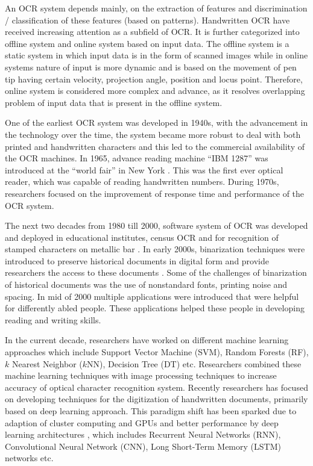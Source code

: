 \documentclass{article}
\begin{document}
An OCR system depends mainly, on the extraction of features and discrimination / classification of these features (based on patterns). Handwritten OCR have received increasing attention as a subfield of OCR.  It is further categorized into offline system \cite{pathan2012recognition,parvez2013offline} and online system \cite{connell2001template} based on input data. The offline system is a static system in which input data is in the form of scanned images while in online systems nature of input is more dynamic and is based on the movement of pen tip having certain velocity, projection angle, position and locus point. Therefore, online system is considered more complex and advance, as it resolves overlapping problem of input data that is present in the offline system.

One of the earliest OCR system was developed in 1940s, with the advancement in the technology over the time, the system became more robust to deal with both printed and handwritten characters and this led to the commercial availability of the OCR machines. In 1965, advance reading machine ``IBM 1287'' was introduced at the ``world fair'' in New York \cite{Mori1992}. This was the first ever optical reader, which was capable of reading handwritten numbers.  During 1970s,  researchers focused on the improvement of response time and performance of the OCR system.  

The next two decades from 1980 till 2000, software system of OCR was developed and deployed in educational institutes, census OCR \cite{wilkinson1992first} and for recognition of stamped characters on metallic bar \cite{Kovacs-V1995}. In early 2000s, binarization techniques were introduced to preserve historical documents in digital form and provide researchers the access to these documents \cite{wolf2002text,gatos2004adaptive,he2005comparison,sari2002off}. Some of the challenges of binarization of historical documents was the use of nonstandard fonts, printing noise and spacing. In mid of 2000 multiple applications were introduced that were helpful for differently abled people. These applications helped these people in developing reading and writing skills. 


In the current decade, researchers have worked on different machine learning approaches which include Support Vector Machine (SVM), Random Forests (RF), $k$ Nearest Neighbor ($k$NN), Decision Tree (DT) \cite{Mitchell, lorigo2006offline, Khan2019a} etc. Researchers combined these machine learning techniques with image processing techniques to increase accuracy of optical character recognition system. Recently researchers has focused on developing techniques for the digitization of handwritten documents, primarily based on deep learning \cite{DL} approach. This paradigm shift has been sparked due to adaption of cluster computing and GPUs and better performance by deep learning architectures \cite{66287}, which includes Recurrent Neural Networks (RNN), Convolutional Neural Network (CNN), Long Short-Term Memory (LSTM) networks etc. 
\end{document}
